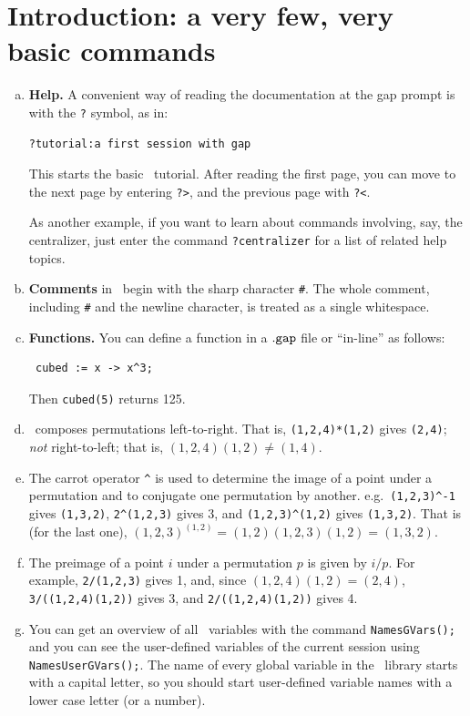 \section{Introduction: a very few, very basic commands}
\begin{enumerate}[a.]
\item {\bf Help.}  A convenient way of reading the documentation at the gap prompt is
 with the {\tt ?} symbol, as in:
{\codesize
\begin{verbatim}
?tutorial:a first session with gap
\end{verbatim}}
\noindent This starts the basic \gap\ tutorial.  After reading the first page,
you can move to the next page by entering {\tt ?>}, and the previous page with
{\tt ?<}.  

As another example, if you want to learn about commands involving, say,
the centralizer, just enter the command
{\tt ?centralizer} for a list of related help topics.

\item {\bf Comments} 
in \gap\ begin with the sharp character {\tt \#}.  The whole comment, including
{\tt \#} and the newline character, is treated as a single whitespace. 

\item {\bf Functions.} You can define a function in a ${\tt .gap}$ file or ``in-line'' as follows:
{\codesize
\begin{verbatim}
 cubed := x -> x^3;
\end{verbatim}}
\noindent Then {\tt cubed(5)} returns 125.

\item 
\gap\ composes permutations left-to-right.  
That is, \verb|(1,2,4)*(1,2)| gives \verb|(2,4)|;\\
\emph{not} right-to-left; that is, $(1,2,4)(1,2) \neq (1,4)$.

\item
The carrot operator \verb|^| is used to determine the image of a point under a
permutation and to conjugate one permutation by another. 
e.g.~\verb|(1,2,3)^-1| gives \verb|(1,3,2)|, \verb|2^(1,2,3)| gives 3, and
\verb|(1,2,3)^(1,2)| gives \verb|(1,3,2)|.
That is (for the last one), $(1,2,3)^{(1,2)} = (1,2)(1,2,3)(1,2) = (1,3,2)$.
\item
The preimage of a point $i$ under a permutation $p$ is given by $i/p$.  For example,
\verb|2/(1,2,3)| gives 1, and, since $(1,2,4)(1,2) = (2,4)$,
\verb|3/((1,2,4)(1,2))| gives 3, and \verb|2/((1,2,4)(1,2))| gives 4.
\item 
You can get an overview of all \gap\ variables with the command {\tt NamesGVars();} and
you can see the user-defined variables of the current session using 
{\tt NamesUserGVars();}.
The name of every global variable in the \gap\ library starts with a capital letter, so you
should start user-defined variable names with a lower case letter (or a number).
\end{enumerate}

